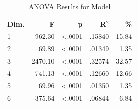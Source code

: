 \begin{table}[H]
  \centering
  \caption{ANOVA Results for Model}
  \label{tab:anova_model}
  \begin{tabular}{l r r r r}
    Dim. & F & p & R$^2$ & \% \\
    \hline
    1 & 962.30 & <.0001 & .15840 & 15.84 \\
    2 & 69.89 & <.0001 & .01349 & 1.35 \\
    3 & 2470.10 & <.0001 & .32574 & 32.57 \\
    4 & 741.13 & <.0001 & .12660 & 12.66 \\
    5 & 69.96 & <.0001 & .01350 & 1.35 \\
    6 & 375.64 & <.0001 & .06844 & 6.84 \\
  \end{tabular}
\end{table}
